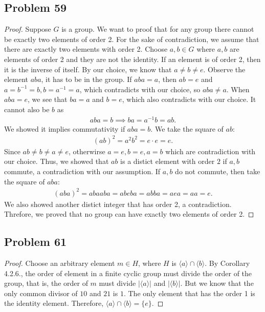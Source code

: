 \documentclass[a4paper,12pt]{article}
\begin{document}
\subsection*{Problem 59}
\begin{proof}
    Suppose $G$ is a group. We want to proof that for any group there cannot be exactly two elements of order 2. For the sake of contradiction, we assume that there are exactly two elements with order 2. Choose $a,b \in G$ where $a,b$ are elements of order 2 and they are not the identity. If an element is of order 2, then it is the inverse of itself. By our choice, we know that $a \ne b \ne e.$ Observe the element $aba$, it has to be in the group. If $aba=a$, then $ab=e$ and $a=b^{-1}=b, b=a^{-1}=a$, which contradicts with our choice, so $aba \ne a$.  When $aba=e$, we see that $ba=a$ and $b=e$, which also contradicts with our choice. It cannot also be $b$ as
    \begin{align*}
        aba=b \implies
        ba=a^{-1}b=ab.
    \end{align*} 
We showed it implies commutativity if $aba=b.$ We take the square of $ab:$ 
\begin{align*}
    (ab)^2=a^2b^2=e\cdot e=e.
\end{align*}
Since $ab \ne b \ne a \ne e$, otherwirse $a=e, b=e, a=b$ which are contradiction with our choice. Thus, we showed that $ab$ is a distict element with order $2$ if $a,b$ commute, a contradiction with our assumption. If $a,b$ do not commute, then take the square of $aba$: 
\begin{align*}
    (aba)^2=abaaba=abeba=abba=aea=aa=e.
\end{align*} We also showed another distict integer that has order 2, a contradiction. Threfore, we proved that no group can have exactly two elements of order 2.
\end{proof}
\subsection*{Problem 61}
\begin{proof}
    Choose an arbitrary element $m\in H$, where $H$ is $\langle a \rangle \cap \langle b \rangle$. By Corollary 4.2.6., the order of element in a finite cyclic group must divide the order of the group, that is, the order of $m$ must divide $|\langle a \rangle|$ and $|\langle b \rangle|$. But we know that the only common divisor of $10$ and $21$ is $1$. The only element that has the order 1 is the identity element. Therefore, $\langle a \rangle \cap \langle b \rangle=\{e\}.$ 
\end{proof}
\end{document}
